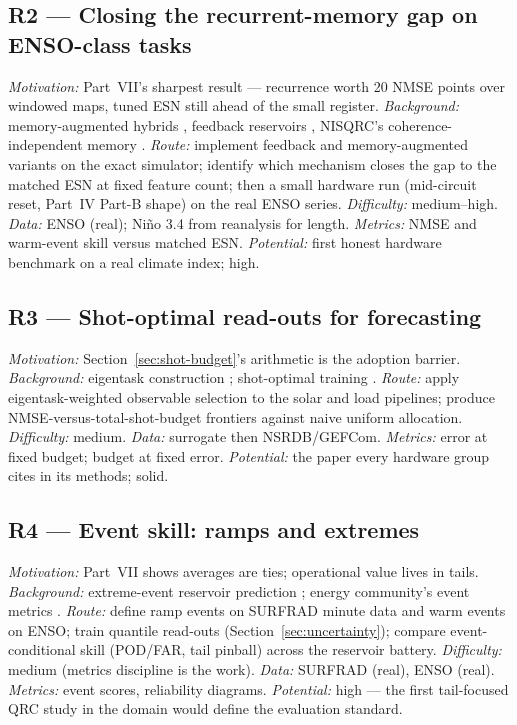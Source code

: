 \subsection*{R2 --- Closing the recurrent-memory gap on ENSO-class tasks}
\emph{Motivation:} Part~VII's sharpest result --- recurrence worth 20 NMSE
points over windowed maps, tuned ESN still ahead of the small register.
\emph{Background:} memory-augmented hybrids \citep{settino2025memory},
feedback reservoirs \citep{kobayashi2024feedback}, NISQRC's
coherence-independent memory \citep{hu2024overcoming}.
\emph{Route:} implement feedback and memory-augmented variants on the exact
simulator; identify which mechanism closes the gap to the matched ESN at
fixed feature count; then a small hardware run (mid-circuit reset, Part~IV
Part-B shape) on the real ENSO series. \emph{Difficulty:} medium--high.
\emph{Data:} ENSO (real); Ni\~no 3.4 from reanalysis for length.
\emph{Metrics:} NMSE and warm-event skill versus matched ESN.
\emph{Potential:} first honest hardware benchmark on a real climate index;
high.

\subsection*{R3 --- Shot-optimal read-outs for forecasting}
\emph{Motivation:} Section~\ref{sec:shot-budget}'s arithmetic is the
adoption barrier. \emph{Background:} eigentask construction
\citep{hu2023tackling}; shot-optimal training \citep{ahmed2025optimal}.
\emph{Route:} apply eigentask-weighted observable selection to the solar and
load pipelines; produce NMSE-versus-total-shot-budget frontiers against
naive uniform allocation. \emph{Difficulty:} medium.
\emph{Data:} surrogate then NSRDB/GEFCom. \emph{Metrics:} error at fixed
budget; budget at fixed error. \emph{Potential:} the paper every hardware
group cites in its methods; solid.

\subsection*{R4 --- Event skill: ramps and extremes}
\emph{Motivation:} Part~VII shows averages are ties; operational value
lives in tails. \emph{Background:} extreme-event reservoir prediction
\citep{ahmed2024prediction}; energy community's event metrics
\citep{hong2016gefcom,inman2013solar}. \emph{Route:} define ramp events on
SURFRAD minute data and warm events on ENSO; train quantile read-outs
(Section~\ref{sec:uncertainty}); compare event-conditional skill (POD/FAR,
tail pinball) across the reservoir battery. \emph{Difficulty:} medium
(metrics discipline is the work). \emph{Data:} SURFRAD (real), ENSO (real).
\emph{Metrics:} event scores, reliability diagrams. \emph{Potential:} high
--- the first tail-focused QRC study in the domain would define the
evaluation standard.

